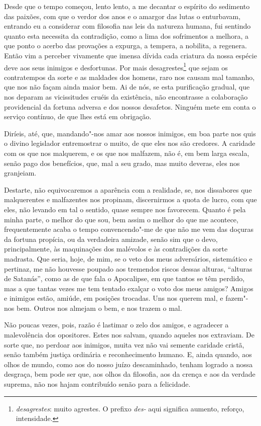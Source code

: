 Desde que o tempo começou, lento lento, a me decantar o espírito
do sedimento das paixões, com que o verdor dos anos e o amargor das
lutas o enturbavam, entrando eu a considerar com filosofia nas leis da
natureza humana, fui sentindo quanto esta necessita da contradição,
como a lima dos sofrimentos a melhora, a que ponto o acerbo das
provações a expurga, a tempera, a nobilita, a regenera. Então vim a
perceber vivamente que imensa dívida cada criatura da nossa espécie
deve aos seus inimigos e desfortunas. Por mais desagrestes\footnote{
\textit{desagrestes}: muito agrestes.  O prefixo \textit{des-} aqui
significa aumento, reforço, intensidade.} que sejam os
contratempos da sorte e as maldades dos homens, raro nos causam mal
tamanho, que nos não façam ainda maior bem. Ai de nós, se esta
purificação gradual, que nos deparam as vicissitudes cruéis da
existência, não encontrasse a colaboração providencial da
fortuna adversa e
dos nossos desafetos. Ninguém mete em conta o serviço contínuo, de que
lhes está em obrigação.

Diríeis, até, que, mandando"-nos amar aos nossos inimigos, em boa
parte nos quis o divino legislador entremostrar o muito, de que eles
nos são credores. A caridade com os que nos malquerem, e os que nos
malfazem, não é, em bem larga escala, senão pago dos benefícios, que,
mal a seu grado, mas muito deveras, eles nos granjeiam.

Destarte, não equivocaremos a aparência com a realidade, se, nos
dissabores que malquerentes e malfazentes nos propinam, discernirmos a
quota de lucro, com que eles, não levando em tal o sentido, quase
sempre nos favorecem. Quanto é pela minha parte, o melhor do que sou,
bem assim o melhor do que me acontece, frequentemente acaba o tempo
convencendo"-me de que não me vem das doçuras da fortuna propícia, ou da
verdadeira amizade, senão sim que o devo, principalmente, às
maquinações dos malévolos e às contradições da sorte madrasta. Que
seria, hoje, de mim, se o veto dos meus adversários, sistemático e
pertinaz, me não houvesse poupado aos tremendos riscos dessas alturas,
``alturas de Satanás'', como as de que fala o
Apocalipse, em que tantos se têm perdido,
mas a que tantas vezes me tem tentado exalçar o voto dos meus amigos?
Amigos e inimigos estão, amiúde, em posições trocadas. Uns nos querem
mal, e fazem"-nos bem. Outros nos almejam o bem, e nos trazem o mal.

Não poucas vezes, pois, razão é lastimar o zelo dos amigos, e
agradecer a malevolência dos opositores. Estes nos salvam, quando
aqueles nos extraviam. De sorte que, no perdoar aos inimigos, muita vez
não vai semente caridade cristã, senão também justiça ordinária e
reconhecimento humano. E, ainda quando, aos olhos de mundo, como aos do
nosso juízo descaminhado, tenham logrado a nossa desgraça, bem pode ser
que, aos olhos da filosofia, aos da crença e aos da verdade suprema,
não nos hajam contribuído senão para a felicidade.

